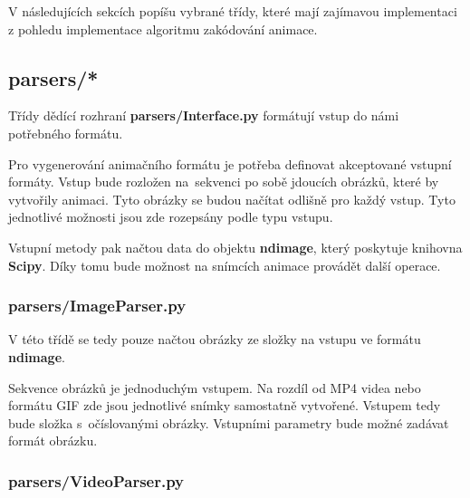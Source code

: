 \begin{figure}[h]
\end{figure}
\FloatBarrier


V následujících sekcích popíšu vybrané třídy, které mají zajímavou implementaci z pohledu implementace algoritmu zakódování animace.

\subsection{parsers/*}

Třídy dědící rozhraní \textbf{parsers/Interface.py} formátují vstup do námi potřebného formátu.

Pro vygenerování animačního formátu je potřeba definovat akceptované vstupní formáty. Vstup bude rozložen na~sekvenci po sobě jdoucích obrázků, které by vytvořily animaci. Tyto obrázky se budou načítat odlišně pro každý vstup. Tyto jednotlivé možnosti jsou zde rozepsány podle typu vstupu.

Vstupní metody pak načtou data do objektu \textbf{ndimage}, který poskytuje knihovna \textbf{Scipy}. Díky tomu bude možnost na snímcích animace provádět další operace.

\subsubsection*{parsers/ImageParser.py}

V této třídě se tedy pouze načtou obrázky ze složky na vstupu ve formátu \textbf{ndimage}.

Sekvence obrázků je jednoduchým vstupem. Na rozdíl od MP4 videa nebo formátu GIF zde jsou jednotlivé snímky samostatně vytvořené. Vstupem tedy bude složka s~očíslovanými obrázky. Vstupními parametry bude možné zadávat formát obrázku.

\subsubsection*{parsers/VideoParser.py}

